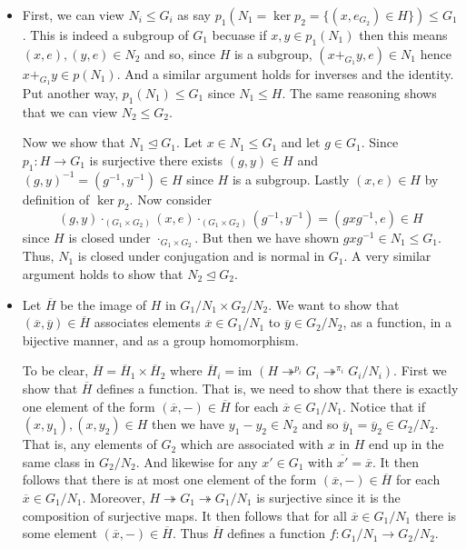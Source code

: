 \documentclass[12pt,letterpaper,boxed]{hmcpset}
\newcommand{\im}{\text{im }}
\newcommand{\inv}{^{-1}}
\newcommand{\normal}{\unlhd} %
\begin{document}
\begin{solution}
\begin{itemize}
\item First, we can view $N_i \leq G_i$ as say $p_1(N_1 = \ker p_2 =
\{(x,e_{G_2}) \in H\}) \leq
G_1$. This is indeed a subgroup of $G_1$ becuase if $x, y \in
p_1(N_1)$ then this means $(x, e), (y, e) \in N_2$ and so, since $H$
is a subgroup, $(x +_{G_1} y, e)
\in N_1$ hence $x +_{G_1} y \in p(N_1)$. And a similar argument holds for inverses and
the identity. 
Put another way, $p_1(N_1) \leq G_1$ since $N_1 \leq H$. 
The same reasoning shows that we can view $N_2 \leq G_2$. 

Now we show that $N_1 \unlhd G_1$.
Let $x \in N_1 \leq G_1$ and let $g \in G_1$. Since $p_1: H \to G_1$
is surjective there exists $(g, y) \in H$ and $(g, y)\inv = (g\inv, y\inv) \in H$
since $H$ is a subgroup. Lastly $(x,e) \in H$ by definition of $\ker
p_2$. 
Now consider \[
	(g, y) \cdot_{(G_1 \times G_2)} (x, e) \cdot_{(G_1 \times G_2)} (g\inv, y\inv) 
	= (g x g\inv, e) \in H
\]
since $H$ is closed under $\cdot_{G_1 \times G_2}$. But then we have
shown $g x g\inv \in N_1 \leq G_1$. Thus, $N_1$ is closed under
conjugation and is normal in $G_1$. A very similar argument holds to
show that $N_2 \normal G_2$. 

\item Let $\overline H$ be the image of $H$ in $G_1/N_1 \times
G_2/N_2$. We want to show that $(\overline x, \overline y) \in
\overline H$ associates elements $\overline x \in G_1/N_1$ to
$\overline y \in G_2 /N_2$, as a function, in a bijective manner, and
as a group homomorphism.

To be clear, $\overline H = \overline H_1 \times \overline H_2$ where
$\overline H_i = \im (H \twoheadrightarrow^{p_i} G_i
\twoheadrightarrow^{\pi_i} G_i / N_i)$. 
First we show that $\overline H$ defines a function. That is, we need
to show that there is exactly one element of the form $(\overline x,
-) \in \overline H$ for each $\overline x \in G_1/N_1$. 
Notice that if $(x, y_1), (x, y_2) \in H$ then we have $y_1 - y_2 \in
N_2$ and so $\overline y_1 = \overline y_2 \in G_2 / N_2$. That is,
any elements of $G_2$ which are associated with $x$ in $H$
end up in the same class in $G_2 / N_2$.
And likewise for any $x' \in G_1$ with $\overline{x'} = \overline x$.
It then follows that there is
at most one element of the form $(\overline x, -) \in \overline H$ for
each $\overline x \in G_1 / N_1$. Moreover, $H
\twoheadrightarrow G_1 \twoheadrightarrow G_1/N_1$ is surjective since
it is the composition of surjective maps. It then follows that for all
$\overline x \in G_1/N_1$ there is some element $(\overline x, -) \in
\overline H$. Thus $\overline H$ defines a function $f : G_1/N_1 \to
G_2/N_2$. 


\end{itemize}
\end{solution}
\end{document}
